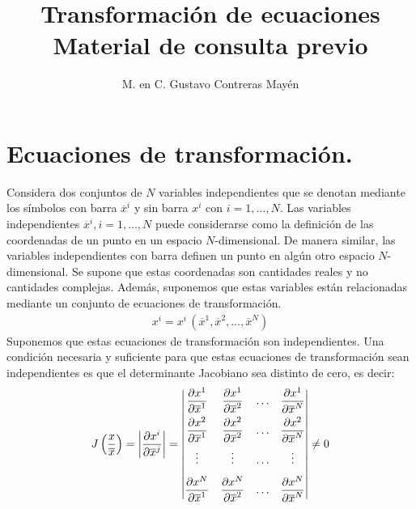 \documentclass[hidelinks,12pt]{article}
\title{Transformación de ecuaciones \\ \large{Material de consulta previo}\vspace{-3ex}}
\author{M. en C. Gustavo Contreras Mayén}
\date{ }
\begin{document}
\vspace{-4cm}
\maketitle
\fontsize{14}{14}\selectfont
\tableofcontents
\newpage


\section{Ecuaciones de transformación.}

Considera dos conjuntos de $N$ variables independientes que se denotan mediante los símbolos con barra $\overline{x}^{i}$ y sin barra $x^{i}$ con $i = 1, \ldots, N$. Las variables independientes $x^{i}, i = 1, \ldots, N$ puede considerarse como la definición de las coordenadas de un punto en un espacio $N$-dimensional. De manera similar, las variables independientes con barra definen un punto en algún otro espacio $N$-dimensional. Se supone que estas coordenadas son cantidades reales y no cantidades complejas. Además, suponemos que estas variables están relacionadas mediante un conjunto de ecuaciones de transformación.
\begin{align}
x^{i} = x^{i} \, \left( \overline{x}^{1}, \overline{x}^{2}, \ldots, \overline{x}^{N} \right)
\label{eq:ecuacion_01_01_07}
\end{align}
Suponemos que estas ecuaciones de transformación son independientes. Una condición necesaria y suficiente para que estas ecuaciones de transformación sean independientes es que el determinante Jacobiano sea distinto de cero, es decir:
\begin{align*}
J \left( \dfrac{x}{\overline{x}} \right) = \abs{\pdv{x^{i}}{\overline{x}^{j}}} = 
\mqty| \displaystyle \pdv{x^{1}}{\overline{x}^{1}} & \displaystyle \pdv{x^{1}}{\overline{x}^{2}} & \ldots & \displaystyle \pdv{x^{1}}{\overline{x}^{N}} \\[0.75em]
\displaystyle \pdv{x^{2}}{\overline{x}^{1}} & \displaystyle \pdv{x^{2}}{\overline{x}^{2}} & \ldots & \displaystyle \pdv{x^{2}}{\overline{x}^{N}} \\[0.75em]
\vdots & \vdots & \hdots & \vdots \\[0.75em]
\displaystyle \pdv{x^{N}}{\overline{x}^{1}} & \displaystyle \pdv{x^{N}}{\overline{x}^{2}} & \ldots & \displaystyle \pdv{x^{N}}{\overline{x}^{N}} | \neq 0
\end{align*}
\end{document}
